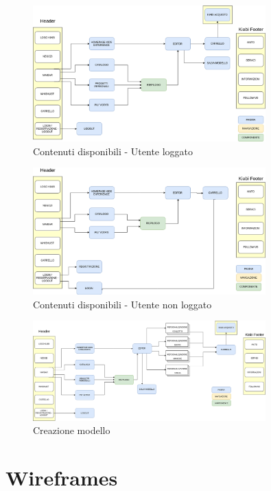 \documentclass[12pt,italian,]{report}
\begin{document}
\begin{figure}[h]
\centering
\includegraphics[width=0.8\textwidth]{img/Utente_loggato.png}
\caption{Contenuti disponibili - Utente loggato}
\label{utente loggato}
\end{figure}

\begin{figure}[h]
\centering
\includegraphics[width=0.8\textwidth]{img/Utente_non_loggato.png}
\caption{Contenuti disponibili - Utente non loggato}
\label{utente non loggato}
\end{figure}

\begin{figure}[h]
\centering
\includegraphics[width=0.8\textwidth]{img/Creazione_modello.png}
\caption{Creazione modello}
\label{creazione modello}
\end{figure}

\newpage
\section{Wireframes}\label{wireframes}
\end{document}
